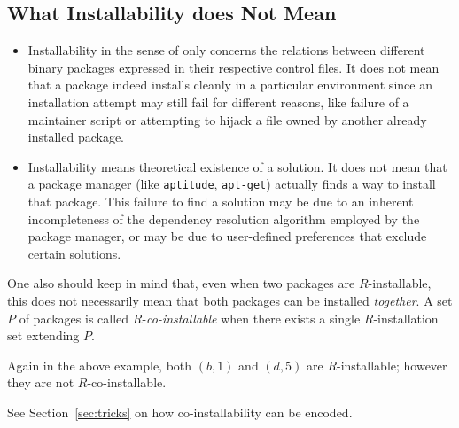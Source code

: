 \subsection{What Installability does Not Mean}

\begin{itemize}
\item Installability in the sense of \debcheck{} only concerns the
  relations between different binary packages expressed in their
  respective control files. It does not mean that a package indeed
  installs cleanly in a particular environment since an installation
  attempt may still fail for different reasons, like failure of a
  maintainer script or attempting to hijack a file owned by another
  already installed package.
\item Installability means theoretical existence of a solution. It
  does not mean that a package manager (like \texttt{aptitude},
  \texttt{apt-get}) actually finds a way to install that package.
  This failure to find a solution may be due to an inherent
  incompleteness of the dependency resolution algorithm employed by
  the package manager, or may be due to user-defined preferences that
  exclude certain solutions.
\end{itemize}

One also should keep in mind that, even when two packages are
$R$-installable, this does not necessarily mean that both packages can
be installed \emph{together}. A set $P$ of packages is called
$R$-\emph{co-installable} when there exists a single $R$-installation
set extending $P$.

\begin{example}
  Again in the above example, both $(b,1)$ and $(d,5)$ are
  $R$-installable; however they are not $R$-co-installable.
\end{example}

See Section~\ref{sec:tricks} on how co-installability can be encoded.
